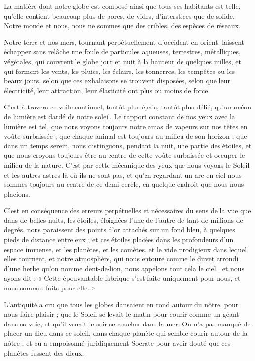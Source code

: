 \documentclass[a4paper, 11pt, oneside]{article}
\begin{document}
La matière dont notre globe est composé ainsi que tous ses habitants est telle, qu'elle contient beaucoup plus de pores, de vides, d'interstices que de solide. Notre monde et nous, nous ne sommes que des cribles, des espèces de réseaux.

Notre terre et nos mers, tournant perpétuellement d'occident en orient, laissent échapper sans relâche une foule de particules aqueuses, terrestres, métalliques, végétales, qui couvrent le globe jour et nuit à la hauteur de quelques milles, et qui forment les vents, les pluies, les éclairs, les tonnerres, les tempêtes ou les beaux jours, selon que ces exhalaisons se trouvent disposées, selon que leur électricité, leur attraction, leur élasticité ont plus ou moins de force.

C'est à travers ce voile continuel, tantôt plus épais, tantôt plus délié, qu'un océan de lumière est dardé de notre soleil. Le rapport constant de nos yeux avec la lumière est tel, que nous voyons toujours notre amas de vapeurs sur nos têtes en voûte surbaissée ; que chaque animal est toujours au milieu de son horizon ; que dans un temps serein, nous distinguons, pendant la nuit, une partie des étoiles, et que nous croyons toujours être au centre de cette voûte surbaissée et occuper le milieu de la nature. C'est par cette mécanique des yeux que nous voyons le Soleil et les autres astres là où ils ne sont pas, et qu'en regardant un arc-en-ciel nous sommes toujours au centre de ce demi-cercle, en quelque endroit que nous nous placions.

C'est en conséquence des erreurs perpétuelles et nécessaires du sens de la vue que dans de belles nuits, les étoiles, éloignées l'une de l'autre de tant de millions de degrés, nous paraissent des points d'or attachés sur un fond bleu, à quelques pieds de distance entre eux ; et ces étoiles placées dans les profondeurs d'un espace immense, et les planètes, et les comètes, et le vide prodigieux dans lequel elles tournent, et notre atmosphère, qui nous entoure comme le duvet arrondi d'une herbe qu'on nomme dent-de-lion, nous appelons tout cela le ciel ; et nous ayons dit : « Cette épouvantable fabrique s'est faite uniquement pour nous, et nous sommes faits pour elle. »

L'antiquité a cru que tous les globes dansaient en rond autour du nôtre, pour nous faire plaisir ; que le Soleil se levait le matin pour courir comme un géant dans sa voie, et qu'il venait le soir se coucher dans la mer. On n'a pas manqué de placer un dieu dans ce soleil, dans chaque planète qui semble courir autour de la nôtre ; et ou a empoisonné juridiquement Socrate pour avoir douté que ces planètes fussent des dieux.
\end{document}
